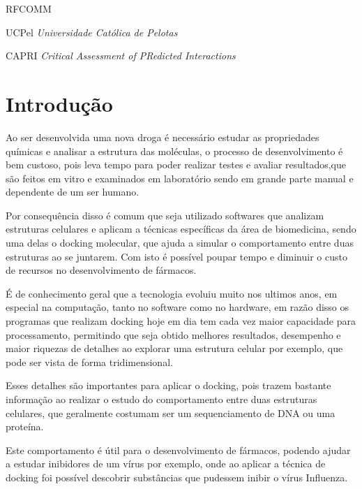 \documentclass[tcc, capa]{texucpel}
\begin{document}
\listoffigures

\listoftables

\begin{listofabbrv}{RFCOMM}
		\item[UCPel] \textit{Universidade Cat\'olica de Pelotas}
        \item[CAPRI] \textit{Critical Assessment of PRedicted Interactions}

        
        
\end{listofabbrv}

\tableofcontents

\chapter{Introdução}
Ao ser desenvolvida uma nova droga é necessário estudar as propriedades químicas e analisar a estrutura das moléculas, o processo de desenvolvimento é bem custoso, pois leva tempo para poder realizar testes e avaliar resultados,que são feitos em vitro e examinados em laboratório sendo em grande parte manual e dependente de um ser humano.%

Por consequência disso é comum que seja utilizado softwares que analizam estruturas celulares e aplicam a técnicas específicas da área de biomedicina, sendo uma delas o docking molecular, que ajuda a simular o comportamento entre duas estruturas ao se juntarem.
Com isto é possível poupar tempo e diminuir o custo de recursos no desenvolvimento de fármacos.

É de conhecimento geral que a tecnologia evoluiu muito nos ultimos anos, em especial na computação, tanto no software como no hardware,  em razão disso os programas que realizam docking hoje em dia tem cada vez maior capacidade para processamento, permitindo que seja obtido melhores resultados, desempenho e maior riquezas de detalhes ao explorar uma estrutura celular por exemplo, que pode ser vista de forma tridimensional.

Esses detalhes são importantes para aplicar o docking, pois trazem bastante informação ao realizar o estudo do comportamento entre duas estruturas celulares, que geralmente costumam ser um sequenciamento de DNA ou uma proteína.%

Este comportamento é útil para o desenvolvimento de fármacos, podendo ajudar a estudar inibidores de um vírus por exemplo,  onde ao aplicar a técnica de docking foi possível descobrir substâncias que pudessem inibir o vírus Influenza\cite{ishikawa2011binding}.
\end{document}
